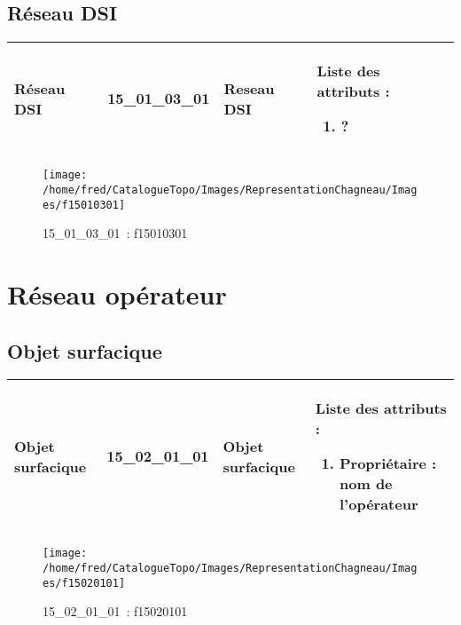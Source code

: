 \documentclass[12pt,titlepage]{book}
\begin{document}
\subsection{Réseau DSI}
\noindent
\vspace{\baselineskip}

\renewcommand{\arraystretch}{1.2}
\begin{supertabular}{|p{10cm}|c|p{13cm}|p{12cm}|}
 Réseau DSI & 15\_01\_03\_01 & Reseau DSI & Liste des attributs :
\begin{enumerate}
  \item ?\end{enumerate}
\\
\hline
\end{supertabular}
\begin{figure}[h!]
  \hfill         %
  \begin{minipage}[t]{3cm}
    \begin{center}
      \texttt{[image: /home/fred/CatalogueTopo/Images/RepresentationChagneau/Images/f15010301]}
      \caption[~15\_01\_03\_01]{\small{15\_01\_03\_01~:} \tiny{f15010301}}\label{f15010301}
    \end{center}
  \end{minipage}
\end{figure}

\section{\large Réseau opérateur}
\subsection{Objet surfacique}
\noindent
\vspace{\baselineskip}

\renewcommand{\arraystretch}{1.2}
\begin{supertabular}{|p{10cm}|c|p{13cm}|p{12cm}|}
 Objet surfacique & 15\_02\_01\_01 & Objet surfacique & Liste des attributs :
\begin{enumerate}
  \item Propriétaire : nom de l'opérateur\end{enumerate}
\\
\hline
\end{supertabular}
\begin{figure}[h!]
  \hfill         %
  \begin{minipage}[t]{3cm}
    \begin{center}
      \texttt{[image: /home/fred/CatalogueTopo/Images/RepresentationChagneau/Images/f15020101]}
      \caption[~15\_02\_01\_01]{\small{15\_02\_01\_01~:} \tiny{f15020101}}\label{f15020101}
    \end{center}
  \end{minipage}
\end{figure}
\end{document}
